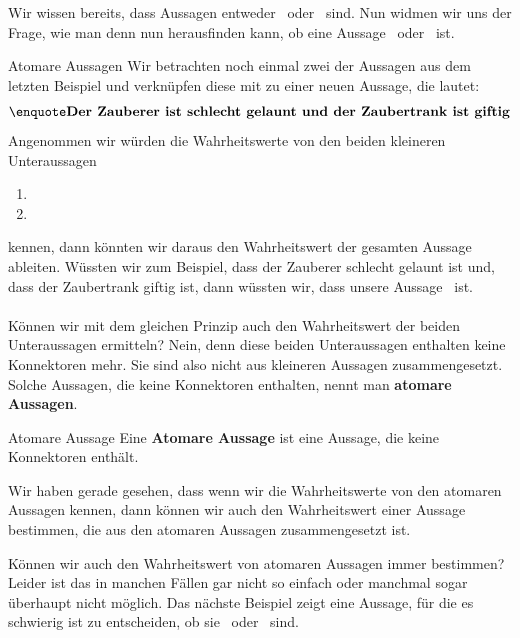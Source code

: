\documentclass[../../main.tex]{subfiles}
\begin{document}
Wir wissen bereits, dass Aussagen entweder \wahr\  oder \falsch\  sind.
Nun widmen wir uns der Frage, wie man denn nun herausfinden kann, 
ob eine Aussage \wahr\  oder \falsch\  ist. 

\begin{example}{Atomare Aussagen}
    Wir betrachten noch einmal zwei der Aussagen aus dem letzten Beispiel und verknüpfen diese mit  zu einer neuen Aussage, die lautet:
    \[\statement{Der Zauberer ist schlecht gelaunt und der Zaubertrank ist giftig}\]
    Angenommen wir würden die Wahrheitswerte von den beiden kleineren Unteraussagen
    \begin{enumerate}
        \item {}
        \item {}
    \end{enumerate}
    kennen, dann könnten wir daraus den Wahrheitswert der gesamten Aussage ableiten. Wüssten wir zum Beispiel, dass der Zauberer schlecht gelaunt ist und, dass der Zaubertrank giftig ist, dann wüssten wir, dass unsere Aussage  \wahr\  ist.
    \\ \\
    Können wir mit dem gleichen Prinzip auch den Wahrheitswert der beiden Unteraussagen ermitteln? Nein, denn diese beiden Unteraussagen enthalten keine Konnektoren mehr. Sie sind also nicht aus kleineren Aussagen zusammengesetzt. Solche Aussagen, die keine Konnektoren enthalten, nennt man \textbf{atomare Aussagen}.
    \end{example}

\begin{definition} {Atomare Aussage}
Eine \textbf{Atomare Aussage} ist eine Aussage, die keine Konnektoren enthält.
\end{definition}

Wir haben gerade gesehen, dass wenn wir die Wahrheitswerte von den atomaren
Aussagen kennen, dann können wir auch den Wahrheitswert einer Aussage bestimmen,
die aus den atomaren Aussagen zusammengesetzt ist.

Können wir auch den Wahrheitswert von atomaren 
Aussagen immer bestimmen? Leider ist das in manchen Fällen gar nicht so einfach 
oder manchmal sogar 
überhaupt nicht möglich. Das nächste Beispiel zeigt eine Aussage, für die es
schwierig ist zu entscheiden, ob sie \wahr\  oder \falsch\  sind.
\end{document}
